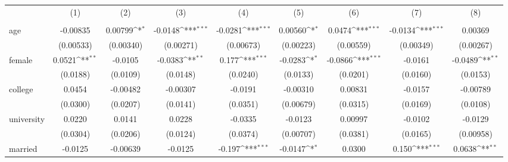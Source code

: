 {
\def\sym#1{\ifmmode^{#1}\else\(^{#1}\)\fi}
\begin{tabular}{l*{8}{c}}
\hline\hline
            &\multicolumn{1}{c}{(1)}&\multicolumn{1}{c}{(2)}&\multicolumn{1}{c}{(3)}&\multicolumn{1}{c}{(4)}&\multicolumn{1}{c}{(5)}&\multicolumn{1}{c}{(6)}&\multicolumn{1}{c}{(7)}&\multicolumn{1}{c}{(8)}\\
            &\multicolumn{1}{c}{} &\multicolumn{1}{c}{} &\multicolumn{1}{c}{} &\multicolumn{1}{c}{} &\multicolumn{1}{c}{} &\multicolumn{1}{c}{} &\multicolumn{1}{c}{} &\multicolumn{1}{c}{} \\
\hline
age         &    -0.00835         &     0.00799\sym{*}  &     -0.0148\sym{***}&     -0.0281\sym{***}&     0.00560\sym{*}  &      0.0474\sym{***}&     -0.0134\sym{***}&     0.00369         \\
            &   (0.00533)         &   (0.00340)         &   (0.00271)         &   (0.00673)         &   (0.00223)         &   (0.00559)         &   (0.00349)         &   (0.00267)         \\
[1em]
female      &      0.0521\sym{**} &     -0.0105         &     -0.0383\sym{**} &       0.177\sym{***}&     -0.0283\sym{*}  &     -0.0866\sym{***}&     -0.0161         &     -0.0489\sym{**} \\
            &    (0.0188)         &    (0.0109)         &    (0.0148)         &    (0.0240)         &    (0.0133)         &    (0.0201)         &    (0.0160)         &    (0.0153)         \\
[1em]
college     &      0.0454         &    -0.00482         &    -0.00307         &     -0.0191         &    -0.00310         &     0.00831         &     -0.0157         &    -0.00789         \\
            &    (0.0300)         &    (0.0207)         &    (0.0141)         &    (0.0351)         &   (0.00679)         &    (0.0315)         &    (0.0169)         &    (0.0108)         \\
[1em]
university  &      0.0220         &      0.0141         &      0.0228         &     -0.0335         &     -0.0123         &     0.00997         &     -0.0102         &     -0.0129         \\
            &    (0.0304)         &    (0.0206)         &    (0.0124)         &    (0.0374)         &   (0.00707)         &    (0.0381)         &    (0.0165)         &   (0.00958)         \\
[1em]
married     &     -0.0125         &    -0.00639         &     -0.0125         &      -0.197\sym{***}&     -0.0147\sym{*}  &      0.0300         &       0.150\sym{***}&      0.0638\sym{**} \\

\end{tabular}}
